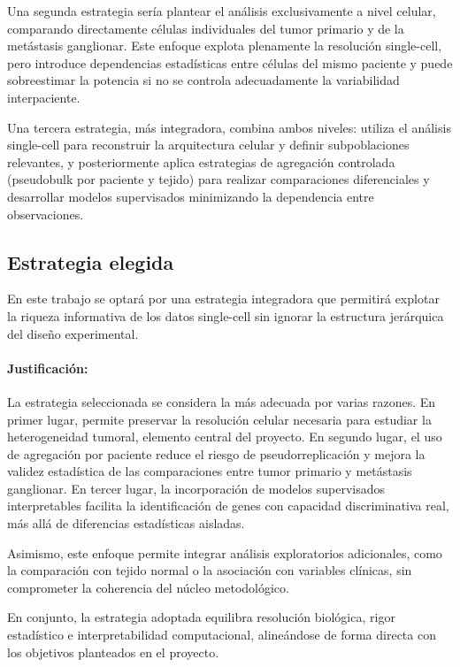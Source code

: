 \documentclass[11pt]{article}
\begin{document}
			Una segunda estrategia sería plantear el análisis exclusivamente a nivel celular, comparando directamente células individuales del tumor primario y de la metástasis ganglionar. Este enfoque explota plenamente la resolución single-cell, pero introduce dependencias estadísticas entre células del mismo paciente y puede sobreestimar la potencia si no se controla adecuadamente la variabilidad interpaciente.
			
			Una tercera estrategia, más integradora, combina ambos niveles: utiliza el análisis single-cell para reconstruir la arquitectura celular y definir subpoblaciones relevantes, y posteriormente aplica estrategias de agregación controlada (pseudobulk por paciente y tejido) para realizar comparaciones diferenciales y desarrollar modelos supervisados minimizando la dependencia entre observaciones.
			
		\subsection{Estrategia elegida}
			
			En este trabajo se optará por una estrategia integradora que permitirá explotar la riqueza informativa de los datos single-cell sin ignorar la estructura jerárquica del diseño experimental.
			
			\paragraph{Justificación:} 
			
			La estrategia seleccionada se considera la más adecuada por varias razones. En primer lugar, permite preservar la resolución celular necesaria para estudiar la heterogeneidad tumoral, elemento central del proyecto. En segundo lugar, el uso de agregación por paciente reduce el riesgo de pseudorreplicación y mejora la validez estadística de las comparaciones entre tumor primario y metástasis ganglionar. En tercer lugar, la incorporación de modelos supervisados interpretables facilita la identificación de genes con capacidad discriminativa real, más allá de diferencias estadísticas aisladas.
			
			Asimismo, este enfoque permite integrar análisis exploratorios adicionales, como la comparación con tejido normal o la asociación con variables clínicas, sin comprometer la coherencia del núcleo metodológico.
			
			En conjunto, la estrategia adoptada equilibra resolución biológica, rigor estadístico e interpretabilidad computacional, alineándose de forma directa con los objetivos planteados en el proyecto.
			
\end{document}
